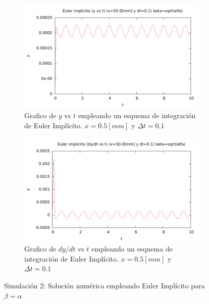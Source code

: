 

\begin{center}
\begin{figure} [H]
	\begin{subfigure}[b]{0.8\textwidth}
		\includegraphics{./parte3/graficos/grafico_euler_S2_y_b1.pdf}
		\caption{Grafico de $y$ vs $t$ empleando un esquema de integración de Euler Implícito. $x=0.5[mm]$ y $\Delta t=0.1$} 
		\label{fig:eulerS2b1_y}
	\end{subfigure}
	
	\begin{subfigure}[b]{0.8\textwidth}
		\includegraphics{./parte3/graficos/grafico_euler_S2_dy_b1.pdf}
		\caption{Grafico de $dy/dt$ vs $t$ empleando un esquema de integración de Euler Implícito. $x=0.5[mm]$ y $\Delta t=0.1$}  
		\label{fig:eulerS2b1_dy}
	\end{subfigure}
\caption{Simulación 2: Solución numérica empleando Euler Implícito para $\beta=\alpha$}
\end{figure}
\end{center}

